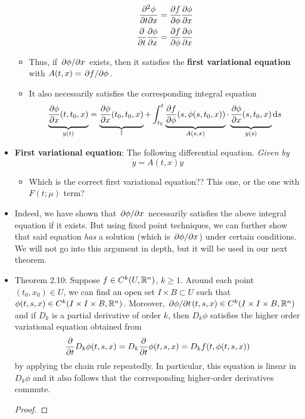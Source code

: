 \documentclass[../notes.tex]{subfiles}
\begin{document}
\begin{itemize}
\begin{itemize}
\begin{align*}
            \pdv{\phi}{t}{x} &= \pdv{f}{\phi}\pdv{\phi}{x}\\
            \pdv{t}\pdv{\phi}{x} &= \pdv{f}{\phi}\pdv{\phi}{x}
        \end{align*}
        \item Thus, if $\pdv*{\phi}{x}$ exists, then it satisfies the \textbf{first variational equation} with $A(t,x)=\pdv*{f}{\phi}$.
        \item It also necessarily satisfies the corresponding integral equation
        \begin{equation*}
            \underbrace{\vphantom{\pdv{f}{\phi}}{\pdv{\phi}{x}}(t,t_0,x)}_{y(t)} = \underbrace{\vphantom{\pdv{f}{\phi}}{\pdv{\phi}{x}}(t_0,t_0,x)}_\mathbb{I}+\int_{t_0}^t\underbrace{{\pdv{f}{\phi}}(s,\phi(s,t_0,x))}_{A(s,x)}\cdot\underbrace{\vphantom{\pdv{f}{\phi}}{\pdv{\phi}{x}}(s,t_0,x)}_{y(s)}\dd{s}
        \end{equation*}
    \end{itemize}
    \item \textbf{First variational equation}: The following differential equation. \emph{Given by}
    \begin{equation*}
        \dot{y} = A(t,x)y
    \end{equation*}
    \begin{itemize}
        \item Which is the correct first variational equation?? This one, or the one with $F(t;\mu)$ term?
    \end{itemize}
    \item Indeed, we have shown that $\pdv*{\phi}{x}$ necessarily satisfies the above integral equation if it exists. But using fixed point techniques, we can further show that said equation \emph{has} a solution (which is $\pdv*{\phi}{x}$) under certain conditions. We will not go into this argument in depth, but it will be used in our next theorem.
    \item Theorem 2.10: Suppose $f\in C^k(U,\mathbb{R}^n)$, $k\geq 1$. Around each point $(t_0,x_0)\in U$, we can find an open set $I\times B\subset U$ such that $\phi(t,s,x)\in C^k(I\times I\times B,\mathbb{R}^n)$. Moreover, ${\pdv*{\phi}{t}}(t,s,x)\in C^k(I\times I\times B,\mathbb{R}^n)$ and if $D_k$ is a partial derivative of order $k$, then $D_k\phi$ satisfies the higher order variational equation obtained from
    \begin{equation*}
        \pdv{t}D_k\phi(t,s,x) = D_k\pdv{t}\phi(t,s,x)
        = D_kf(t,\phi(t,s,x))
    \end{equation*}
    by applying the chain rule repeatedly. In particular, this equation is linear in $D_k\phi$ and it also follows that the corresponding higher-order derivatives commute.
    \begin{proof}


\end{proof}
\end{itemize}
\end{document}
